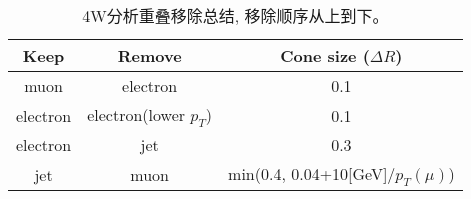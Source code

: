   \begin{table}
  \centering
  \small
  \begin{tabular}{|c|c|c|}
  \hline
               Keep        &Remove            &Cone size ($\Delta R$) \\
  \hline
               muon    &electron   &0.1 \\
  \hline
               electron     &electron(lower $p_T$)          &0.1 \\
  \hline
               electron    &jet               &0.3      \\
  \hline
               jet        &muon               &min(0.4, 0.04+10[GeV]/$p_T(\mu)$) \\
  \hline
  \end{tabular}
  \caption{4W分析重叠移除总结, 移除顺序从上到下。}
  \label{tab:4w_olr}
  \end{table}
